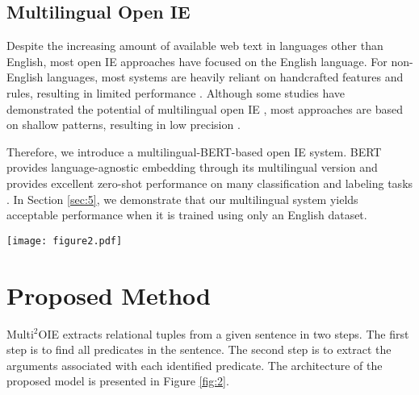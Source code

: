 \documentclass[11pt,a4paper]{article}
\begin{document}
\subsection{Multilingual Open IE}
\label{sec:2.2}
Despite the increasing amount of available web text in languages other than English, most open IE approaches have focused on the English language.
For non-English languages, most systems are heavily reliant on handcrafted features and rules, resulting in limited performance \citep{zhila-gelbukh-2014-open,Oliveira2019DptOIEAP,8903488,GUARASCI2020112954}.
Although some studies have demonstrated the potential of multilingual open IE \citep{faruqui-kumar-2015-multilingual,10.1007/978-3-319-23485-4_72,white-EtAl:2016:EMNLP2016}, most approaches are based on shallow patterns, resulting in low precision \citep{Claro_2019}.

Therefore, we introduce a multilingual-BERT-based open IE system.
BERT provides language-agnostic embedding through its multilingual version and provides excellent zero-shot performance on many classification and labeling tasks \citep{pires-etal-2019-multilingual,wu-dredze-2019-beto,Karthikeyan2020CrossLingualAO}.
In Section \ref{sec:5}, we demonstrate that our multilingual system yields acceptable performance when it is trained using only an English dataset.

\begin{figure*}[ht]
\texttt{[image: figure2.pdf]}
\caption
{
Architecture of Multi$^2$OIE.
After predicates are extracted using the hidden states of BERT, the hidden sequence, average vector of predicates, and position embedding are concatenated and used as inputs for multi-head attention blocks for argument extraction.
}
\label{fig:2}
\centering
\end{figure*}

\section{Proposed Method}
Multi$^2$OIE extracts relational tuples from a given sentence in two steps. 
The first step is to find all predicates in the sentence.
The second step is to extract the arguments associated with each identified predicate.
The architecture of the proposed model is presented in Figure \ref{fig:2}.
\end{document}
